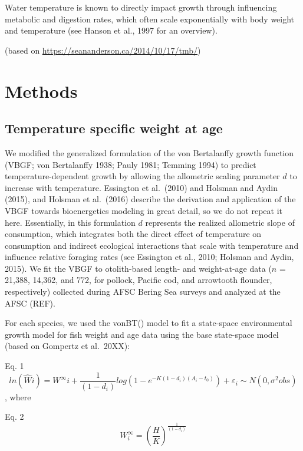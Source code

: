 \documentclass[
]{article}
\begin{document}
Water temperature is known to directly impact growth through influencing
metabolic and digestion rates, which often scale exponentially with body
weight and temperature (see Hanson et al., 1997 for an overview).

(based on \url{https://seananderson.ca/2014/10/17/tmb/})

\section{Methods}\label{methods}

\subsection{Temperature specific weight at
age}\label{temperature-specific-weight-at-age}

We modified the generalized formulation of the von Bertalanffy growth
function (VBGF; von Bertalanffy 1938; Pauly 1981; Temming 1994) to
predict temperature-dependent growth by allowing the allometric scaling
parameter \(d\) to increase with temperature. Essington et al.~(2010)
and Holsman and Aydin (2015), and Holsman et al.~(2016) describe the
derivation and application of the VBGF towards bioenergetics modeling in
great detail, so we do not repeat it here. Essentially, in this
formulation \(d\) represents the realized allometric slope of
consumption, which integrates both the direct effect of temperature on
consumption and indirect ecological interactions that scale with
temperature and influence relative foraging rates (see Essington et al.,
2010; Holsman and Aydin, 2015). We fit the VBGF to otolith-based length-
and weight-at-age data (\(n\) = 21,388, 14,362, and 772, for pollock,
Pacific cod, and arrowtooth flounder, respectively) collected during
AFSC Bering Sea surveys and analyzed at the AFSC (REF).

For each species, we used the vonBT() model to fit a state-space
environmental growth model for fish weight and age data using the base
state-space model (based on Gompertz et al.~20XX):

Eq. 1
\[ ln(\hat{W}{i}) = W^\infty{i} + \frac{1}{(1-d_{i})}log(1-e^{-K(1-d_{i})(A_i-t_0)})+\varepsilon_i\sim N(0,\sigma^2{obs})\]
, where

Eq. 2 \[W^\infty_{i} =(\frac{H}{K})^{\frac{1}{(1 - d_{i})}} \]
\end{document}
